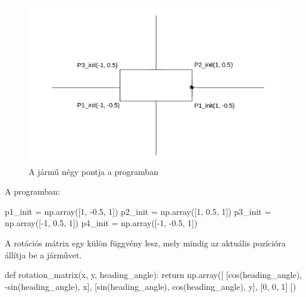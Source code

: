 \begin{figure}[h!]
\centering
\includegraphics[scale=0.70]{images/vehicle_points.png}
\caption{A jármű négy pontja a programban}
\label{fig:vehicle_points}
\end{figure}

A programban:
\begin{python}
p1_init = np.array([1, -0.5, 1])
p2_init = np.array([1, 0.5, 1])
p3_init = np.array([-1, 0.5, 1])
p4_init = np.array([-1, -0.5, 1])
\end{python}

A rotációs mátrix egy külön függvény lesz, mely mindig az aktuális pozícióra állítja be a járművet.
\begin{python}
def rotation_matrix(x, y, heading_angle):
    return np.array([
        [cos(heading_angle), -sin(heading_angle), x],
        [sin(heading_angle), cos(heading_angle), y],
        [0, 0, 1]
    ])
\end{python}

\bigskip

